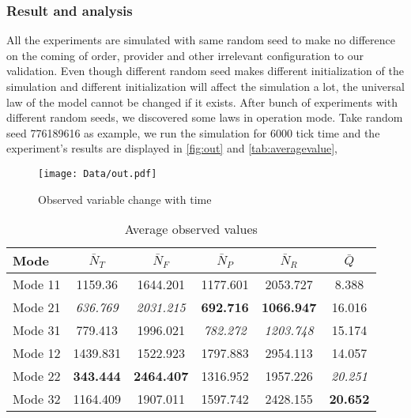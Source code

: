 \subsubsection{Result and analysis} %
\label{ssub:result_and_analysis}
All the experiments are simulated with same random seed to make no difference on the coming of order, provider and other irrelevant configuration to our validation. Even though different random seed makes different initialization of the simulation and different initialization will affect the simulation a lot, the universal law of the model cannot be changed if it exists. After bunch of experiments with different random seeds, we discovered some laws in operation mode. Take random seed 776189616 as example, we run the simulation for 6000 tick time and the experiment's results are displayed in \autoref{fig:out} and \autoref{tab:averagevalue},
\begin{figure}[htbp]
    \centering
    \texttt{[image: Data/out.pdf]}
    \caption{Observed variable change with time}
    \label{fig:out}
\end{figure}
\begin{table}[htbp]
    \caption{Average observed values}
    \label{tab:averagevalue}
    \centering
    \scriptsize
    \begin{tabular}{lccccc}
    \toprule
    \textbf{Mode} & $\bar N_T$ & $\bar N_F$ & $\bar N_P$ & $\bar N_R $ & $\bar Q$\\
    \midrule
    Mode 11 & 1159.36 &  1644.201 &  1177.601 &  2053.727 &  8.388\\
    Mode 21 & \textit{636.769} &  \textit{2031.215} &  \textbf{692.716} &  \textbf{1066.947} &  16.016\\
    Mode 31 & 779.413 &  1996.021 &  \textit{782.272} &  \textit{1203.748} &  15.174\\
    Mode 12 & 1439.831 &  1522.923 &  1797.883 &  2954.113 &  14.057\\
    Mode 22 & \textbf{343.444} &  \textbf{2464.407} &  1316.952 &  1957.226 &  \textit{20.251}\\
    Mode 32 & 1164.409 &  1907.011 &  1597.742 &  2428.155 &  \textbf{20.652}\\

    \bottomrule
    \end{tabular}
\end{table}
